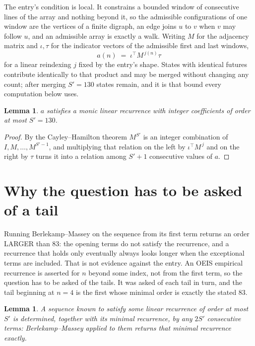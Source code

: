 \documentclass[11pt,a4paper]{article}
\theoremstyle{plain}
\newtheorem{lemma}[theorem]{Lemma}
\theoremstyle{definition}
\begin{document}
The entry's condition is local. It constrains a bounded window of consecutive lines of the
array and nothing beyond it, so the admissible configurations of one window are the vertices of
a finite digraph, an edge joins $u$ to $v$ when $v$ may follow $u$, and an admissible array is
exactly a walk. Writing $M$ for the adjacency matrix and $\iota,\tau$ for the indicator vectors
of the admissible first and last windows,
\[
a(n)\;=\;\iota^{\!\top}M^{\,j(n)}\tau
\]
for a linear reindexing $j$ fixed by the entry's shape. States with identical futures
contribute identically to that product and may be merged without changing any count; after
merging $S'=130$ states remain, and it is that bound every computation below uses.

\begin{lemma}\label{lem:cf}
$a$ satisfies a monic linear recurrence with integer coefficients of order at most $S'=130$.
\end{lemma}

\begin{proof}
By the Cayley--Hamilton theorem $M^{S'}$ is an integer combination of $I,M,\dots,M^{S'-1}$,
and multiplying that relation on the left by $\iota^{\!\top}M^{\,j}$ and on the right by
$\tau$ turns it into a relation among $S'+1$ consecutive values of $a$.
\end{proof}

\section{Why the question has to be asked of a tail}

Running Berlekamp--Massey on the sequence from its first term returns an order LARGER than $83$: the opening terms do not satisfy the recurrence, and a recurrence that holds only eventually always looks longer when the exceptional terms are included. That is not evidence against the entry. An OEIS empirical recurrence is asserted for $n$ beyond some index, not from the first term, so the question has to be asked of the tails. It was asked of each tail in turn, and the tail beginning at $n=4$ is the first whose minimal order is exactly the stated $83$.

\begin{lemma}\label{lem:bm}
A sequence known to satisfy some linear recurrence of order at most $S'$ is determined,
together with its minimal recurrence, by any $2S'$ consecutive terms: Berlekamp--Massey applied
to them returns that minimal recurrence exactly.
\end{lemma}
\end{document}
